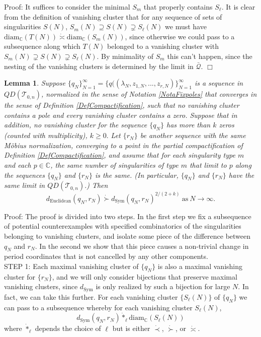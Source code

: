 \documentclass[12pt]{article}
\newtheorem{lemma}[theorem]{Lemma}
\newcommand{\cc}{\mathbb{C}}
\newcommand{\diam}{\mathrm{diam}}
\begin{document}
\noindent Proof: It suffices to consider the minimal $S_m$ that properly contains $S_\ell$. It is clear from the definition of vanishing cluster that for any sequence of sets of singularities $S(N)$, $S_m(N) \supseteq S(N) \supsetneq S_\ell(N)$ we must have $\diam_\cc(T(N)) \dot{\asymp} \diam_\cc(S_m(N))$, since otherwise we could pass to a subsequence along which $T(N)$ belonged to a vanishing cluster with $S_m(N) \supsetneq S(N) \supsetneq S_\ell(N)$. By minimality of $S_m$ this can't happen, since the nesting of the vanishing clusters is determined by the limit in $\bar{\mathcal{Q}}$. $\Box$

\begin{lemma}\label{LemmaPerturbEff} Suppose $\{q_N\}_{N = 1}^\infty = \{q((\lambda_N,z_{1,N},...,z_{r,N})\}_{N = 1}^\infty$ is a sequence in $QD(\mathcal{T}_{0,n})$, normalized in the sense of Notation \ref{NotaFixpoles} that converges in the sense of Definition \ref{DefCompactification}, such that no vanishing cluster contains a pole and every vanishing cluster contains a zero. Suppose that in addition, no vanishing cluster for the sequence $\{q_N\}$ has more than $k$ zeros (counted with multiplicity), $k \geq 0.$ Let $\{r_N\}$ be another sequence with the same M\"obius normalization, converging to a point in the partial compactification of Definition \ref{DefCompactification}, and assume that for each singularity type $m$ and each $p \in \cc$, the same number of singularities of type $m$ that limit to $p$ along the sequences $\{q_N\}$ and $\{r_N\}$ is the same. (In particular, $\{q_N\}$ and $\{r_N\}$ have the same limit in $QD(\mathcal{T}_{0,n}).$) Then $$d_{\mathrm{Euclidean}}(q_N,r_N) \dot{\succ} d_\mathrm{Sym}(q_N,r_N)^{2/(2+k)} ~\mathrm{as}~N \to \infty.$$\end{lemma}

\noindent Proof: The proof is divided into two steps. In the first step we fix a subsequence of potential counterexamples with specified combinatorics of the singularities belonging to vanishing clusters, and isolate some piece of the difference between $q_N$ and $r_N$. In the second we show that this piece causes a non-trivial change in period coordinates that is not cancelled by any other components.\\

\noindent STEP 1: Each maximal vanishing cluster of $\{q_N\}$ is also a maximal vanishing cluster for $\{r_N\}$, and we will only consider bijections that preserve maximal vanishing clusters, since $d_\mathrm{Sym}$ is only realized by such a bijection for large $N$. In fact, we can take this further. For each vanishing cluster $\{S_\ell(N)\}$ of $\{q_N\}$ we can pass to a subsequence whereby for each vanishing cluster $S_\ell(N)$, $$d_\mathrm{Sym}(q_N,r_N) \dot{*}_\ell \diam_\cc(S_\ell(N))$$ where $\dot{*}_\ell$ depends the choice of $\ell$ but is either $\dot{\prec}$, $\dot{\succ}$, or $\dot{\asymp}$.\\
\end{document}
